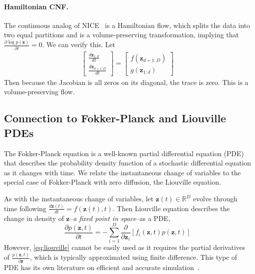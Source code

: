 \documentclass{article}
\newcommand\R{\mathbb{R}}
\newcommand{\vz}{\mathbf{z}}
\newcommand{\sol}{\vz}  %
\newcommand{\cnfx}{\sol}
\begin{document}
\begin{appendices}
\paragraph{Hamiltonian CNF.}
The continuous analog of NICE~\citep{dinh2014nice} is a Hamiltonian flow, which splits the data into two equal partitions and is a volume-preserving transformation, implying that $\frac{\partial \log p({\cnfx})}{\partial t}=0$.
We can verify this.
Let
\begin{align}
\begin{bmatrix}
\frac{d{\cnfx}_{1:d}}{dt} \\ \frac{d{\cnfx}_{d+1:D}}{dt}
\end{bmatrix} = \begin{bmatrix}
f({\cnfx}_{d+1:D}) \\ g({\cnfx}_{1:d})
\end{bmatrix}
\end{align}
Then because the Jacobian is all zeros on its diagonal, the trace is zero. This is a volume-preserving flow.

\subsection{Connection to Fokker-Planck and Liouville PDEs}\label{sec:connect_fp}

The Fokker-Planck equation is a well-known partial differential equation (PDE) that describes the probability density function of a stochastic differential equation as it changes with time. We relate the instantaneous change of variables to the special case of Fokker-Planck with zero diffusion, the Liouville equation.

As with the instantaneous change of variables, let $\sol(t) \in \R^D$ evolve through time following $\frac{d\sol(t)}{dt} = f(\sol(t), t)$. Then Liouville equation describes the change in density of $\sol$--\emph{a fixed point in space}--as a PDE,
\begin{equation}\label{eq:liouville}
\frac{\partial p(\sol, t)}{\partial t} = - \sum_{i=1}^D \frac{\partial}{\partial \sol_i} \left[ f_i(\sol, t) p(\sol, t) \right]
\end{equation}
However, \eqref{eq:liouville} cannot be easily used as it requires the partial derivatives of $\frac{p(\sol, t)}{\partial \sol}$, which is typically approximated using finite difference. This type of PDE has its own literature on efficient and accurate simulation~\citep{stam1999stable}.


\end{appendices}
\end{document}
